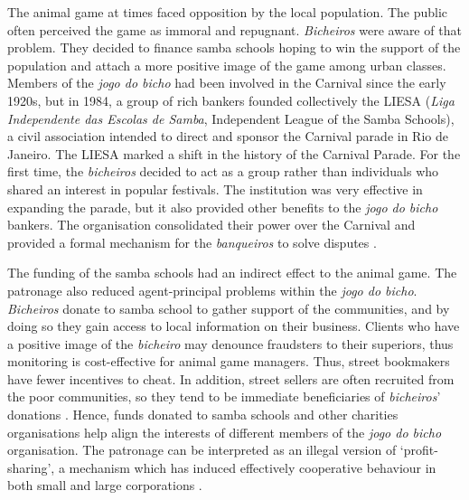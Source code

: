 \documentclass[a4paper,12pt]{article}
\begin{document}
The animal game at times faced opposition by the local population. The public often perceived the game as immoral and repugnant. \emph{Bicheiros} were aware of that problem. They decided to finance samba schools hoping to win the support of the population and attach a more positive image of the game among urban classes. Members of the \emph{jogo do bicho} had been involved in the Carnival since the early 1920s, but in 1984, a group of rich bankers founded collectively the LIESA (\emph{Liga Independente das Escolas de Samba}, Independent League of the Samba Schools), a civil association intended to direct and sponsor the Carnival parade in Rio de Janeiro. The LIESA marked a shift in the history of the Carnival Parade. For the first time, the \emph{bicheiros} decided to act as a group rather than individuals who shared an interest in popular festivals. The institution was very effective in expanding the parade, but it also provided other benefits to the \textit{jogo do bicho} bankers. The organisation consolidated their power over the Carnival and provided a formal mechanism for the \textit{banqueiros} to solve disputes \citetext{\citealp[43]{cavalcanti2006carnaval}; \citealp[171]{farias2013carnival}; \citealp[55]{labronici2012paratodos}}.

The funding of the samba schools had an indirect effect to the animal game. The patronage also reduced agent-principal problems within the \emph{jogo do bicho}. \emph{Bicheiros} donate to samba school to gather support of the communities, and by doing so they gain access to local information on their business. Clients who have a positive image of the \emph{bicheiro} may denounce fraudsters to their superiors, thus monitoring is cost-effective for animal game managers. Thus, street bookmakers have fewer incentives to cheat. In addition, street sellers are often recruited from the poor communities, so they tend to be immediate beneficiaries of \emph{bicheiros}' donations \citep{bbc2012aniz}. Hence, funds donated to samba schools and other charities organisations help align the interests of different members of the \emph{jogo do bicho} organisation. The patronage can be interpreted as an illegal version of `profit-sharing', a mechanism which has induced effectively cooperative behaviour in both small and large corporations \citep{cahuc1997profit,fitzroy1987cooperation, kruse1992profit}.
\end{document}
